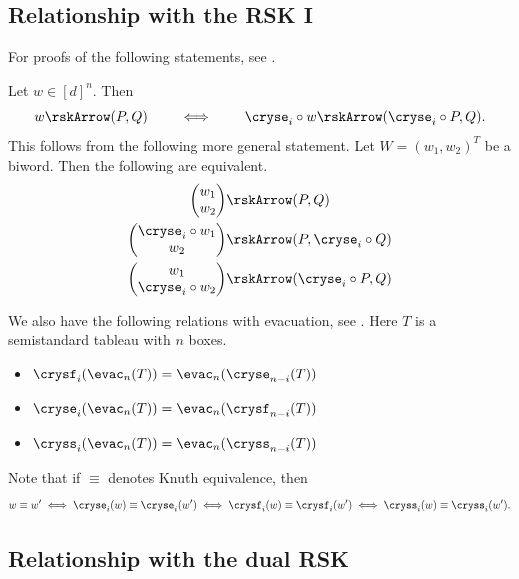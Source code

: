 \subsection[crystalsAndRSKI]{Relationship with the RSK I}

For proofs of the following statements, see \cite[Thm.~5.5.1]{Lothaire2002}.

Let $w \in [d]^n$. Then
\[
w \rskArrow (P,Q)  \qquad \iff  \qquad \cryse_i \circ w  \rskArrow (\cryse_i \circ P,Q).
\]
This follows from the following more general statement.
Let $W = (w_1,w_2)^T$ be a biword. Then the following are equivalent.
\begin{align}
\begin{pmatrix} w_1 \\ w_2 \end{pmatrix} & \rskArrow (P,Q)  \\
\begin{pmatrix} \cryse_i \circ w_1 \\ w_2 \end{pmatrix} & \rskArrow (P, \cryse_i \circ Q) \\
\begin{pmatrix}  w_1 \\ \cryse_i \circ w_2 \end{pmatrix} & \rskArrow ( \cryse_i \circ P, Q)
\end{align}


We also have the following relations with evacuation, see
\cite[Prop.~2.87]{Shimozono2005}.
Here $T$ is a semistandard tableau with $n$ boxes.
\begin{itemize}

\item
$\crysf_i(\evac_n(T)) = \evac_n( \cryse_{n-i}(T) )$

\item
$\cryse_i(\evac_n(T)) = \evac_n( \crysf_{n-i}(T) )$

\item
$\cryss_i(\evac_n(T)) = \evac_n( \cryss_{n-i}(T) )$

\end{itemize}

Note that if $\equiv$ denotes Knuth equivalence, then
\cite[Thm.~5.5.1]{Lothaire2002}
\[
w \equiv w' \iff  \cryse_i(w) \equiv \cryse_i(w')
\iff  \crysf_i(w) \equiv \crysf_i(w')
\iff  \cryss_i(w) \equiv \cryss_i(w').
\]


\subsection[crystalsAndRSKII]{Relationship with the dual RSK}


